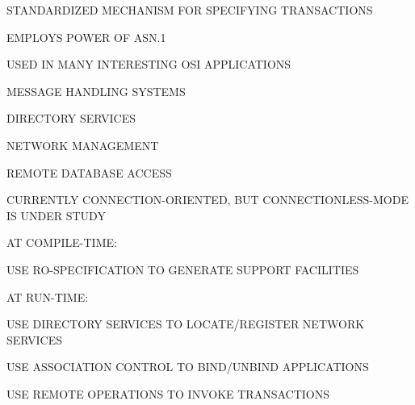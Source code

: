 \begin{bwslide}

\begin{nrtc}
\item	STANDARDIZED MECHANISM FOR SPECIFYING TRANSACTIONS

\item	EMPLOYS POWER OF ASN.1

\item	USED IN MANY INTERESTING OSI APPLICATIONS
    \begin{nrtc}
    \item	MESSAGE HANDLING SYSTEMS

    \item	DIRECTORY SERVICES

    \item	NETWORK MANAGEMENT

    \item	REMOTE DATABASE ACCESS
    \end{nrtc}

\item	CURRENTLY CONNECTION-ORIENTED, BUT CONNECTIONLESS-MODE IS UNDER STUDY
\end{nrtc}
\end{bwslide}

\begin{bwslide}

\begin{nrtc}
\item	AT COMPILE-TIME:
    \begin{nrtc}
    \item	USE RO-SPECIFICATION TO GENERATE SUPPORT FACILITIES
    \end{nrtc}

\item	AT RUN-TIME:
    \begin{nrtc}
    \item	USE DIRECTORY SERVICES TO LOCATE/REGISTER NETWORK SERVICES

    \item	USE ASSOCIATION CONTROL TO BIND/UNBIND APPLICATIONS

    \item	USE REMOTE OPERATIONS TO INVOKE TRANSACTIONS
    \end{nrtc}
\end{nrtc}
\end{bwslide}




